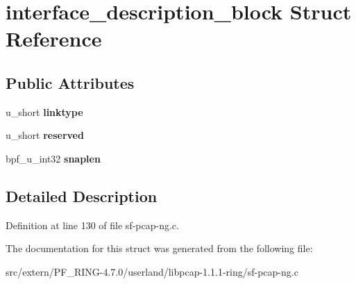 \hypertarget{structinterface__description__block}{
\section{interface\_\-description\_\-block Struct Reference}
\label{structinterface__description__block}
}
\subsection*{Public Attributes}
\begin{DoxyCompactItemize}
\item 
\hypertarget{structinterface__description__block_a1e6df5517375e593e5b848aeacf98150}{
u\_\-short {\bfseries linktype}}
\label{structinterface__description__block_a1e6df5517375e593e5b848aeacf98150}

\item 
\hypertarget{structinterface__description__block_aaf2bd1de56331bd5cc1637372da2bcae}{
u\_\-short {\bfseries reserved}}
\label{structinterface__description__block_aaf2bd1de56331bd5cc1637372da2bcae}

\item 
\hypertarget{structinterface__description__block_ad0fad9c0e23000eebac8b76616a2c348}{
bpf\_\-u\_\-int32 {\bfseries snaplen}}
\label{structinterface__description__block_ad0fad9c0e23000eebac8b76616a2c348}

\end{DoxyCompactItemize}


\subsection{Detailed Description}


Definition at line 130 of file sf-\/pcap-\/ng.c.



The documentation for this struct was generated from the following file:\begin{DoxyCompactItemize}
\item 
src/extern/PF\_\-RING-\/4.7.0/userland/libpcap-\/1.1.1-\/ring/sf-\/pcap-\/ng.c\end{DoxyCompactItemize}
